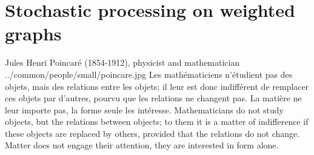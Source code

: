 \chapter{Stochastic processing on weighted graphs}\label{chp:sto}
\qboxnpqt
  { Jules Henri Poincar\'e (1854-1912), physicist and mathematician
    \footnotemark
  }
  {../common/people/small/poincare.jpg}
  {Les math\'ematiciens n'\'etudient pas des objets, 
   mais des relations entre les objets; 
   il leur est donc indiff\'erent de remplacer ces objets par d'autres, 
   pourvu que les relations ne changent pas. 
   La mati\`ere ne leur importe pas, la forme seule les int\'eresse.}
  {Mathematicians do not study objects, but the relations between objects;
   to them it is a matter of indifference if these objects are replaced by others,
   provided that the relations do not change.
   Matter does not engage their attention,
   they are interested in form alone.}
  
  
  


